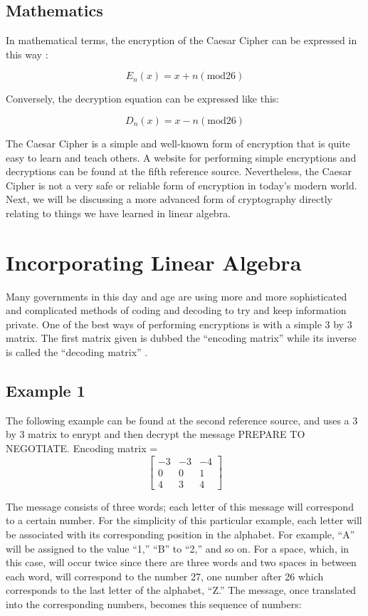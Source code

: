 \documentclass{article}
\begin{document}
\subsection{Mathematics}
In mathematical terms, the encryption of the Caesar Cipher can be expressed in this way \cite{ref3:3}:

$$ E_{n}(x) = x + n  (\text{mod}26)$$

Conversely, the decryption equation can be expressed like this:

$$ D_{n}(x) = x - n  (\text{mod}26)$$

\noindent
The Caesar Cipher is a simple and well-known form of encryption that is quite easy to learn and teach others. A website for performing simple encryptions and decryptions can be found at the fifth reference source. Nevertheless, the Caesar Cipher is not a very safe or reliable form of encryption in today’s modern world. Next, we will be discussing a more advanced form of cryptography directly relating to things we have learned in linear algebra.

\section{Incorporating Linear Algebra}
Many governments in this day and age are using more and more sophisticated and complicated methods of coding and decoding to try and keep information private. One of the best ways of performing encryptions is with a simple 3 by 3 matrix. The first matrix given is dubbed the “encoding matrix” while its inverse is called the “decoding matrix” \cite{ref4:4}.

\subsection{Example 1}
The following example can be found at the second reference source, and uses a 3 by 3 matrix to enrypt and then decrypt the message PREPARE TO NEGOTIATE.
{\center
Encoding matrix = 
$$
\begin{bmatrix}
-3 & -3 & -4 \\
0 & 0 & 1 \\
4 & 3 & 4 
\end{bmatrix}
$$
\endcenter}

\noindent
The message consists of three words; each letter of this message will correspond to a certain number. For the simplicity of this particular example, each letter will be associated with its corresponding position in the alphabet. For example, “A” will be assigned to the value “1,” “B” to “2,” and so on. For a space, which, in this case, will occur twice since there are three words and two spaces in between each word, will correspond to the number 27, one number after 26 which corresponds to the last letter of the alphabet, “Z.” The message, once translated into the corresponding numbers, becomes this sequence of numbers:
\end{document}
